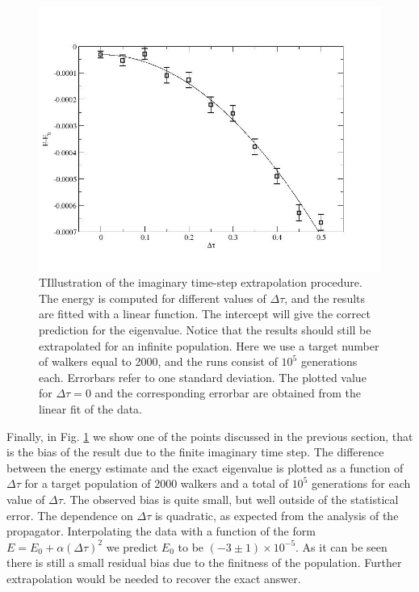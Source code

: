 \begin{figure}
	\begin{center}
		\includegraphics[scale=0.5]{Chapter9-figures/dmc_extr.jpg}
	\end{center}
	\caption{TIllustration of the imaginary time-step extrapolation procedure. The energy is computed for different values of $\Delta\tau$, and the results are fitted with a linear function. The intercept will give the correct prediction for the eigenvalue. Notice that the results should still be extrapolated for an infinite population. Here we use a target number of walkers equal to 2000, and the runs consist of $10^5$ generations each. Errorbars refer to one standard deviation. The plotted value for $\Delta\tau=0$ and the corresponding errorbar are obtained from the linear fit of the data. }
	\label{fig.extr}
\end{figure}

Finally, in Fig. \ref{fig.extr} we show one of the points discussed in the previous section, that is the bias of the result due to the finite imaginary time step. The difference between the energy estimate and the exact eigenvalue is plotted as a function of $\Delta\tau$ for a target population of 2000 walkers and a total of $10^5$ generations for each value of $\Delta\tau$. The observed bias is quite small, but well outside of the statistical error. The dependence on $\Delta\tau$ is quadratic, as expected from the analysis of the propagator. Interpolating the data with a function of the form $E=E_0+\alpha(\Delta\tau)^2$ we predict $E_0$ to be  $(-3\pm1)\times 10^{-5}$. As it can be seen there is still a small residual bias due to the finitness of the population. Further extrapolation would be needed to recover the exact answer. 
 
